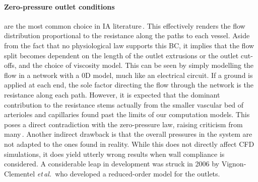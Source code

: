 \paragraph{Zero-pressure outlet conditions} are the most common choice in IA literature\,\cite{Berg2019_challenge, Valen-Sendstad2018}. This effectively renders the flow distribution proportional to the resistance along the paths to each vessel. Aside from the fact that no physiological law supports this BC, it implies that the flow split becomes dependent on the length of the outlet extrusions or the outlet cut-offs, and the choice of viscosity model. This can be seen by simply modelling the flow in a network with a 0D model, much like an electrical circuit. If a ground is applied at each end, the sole factor directing the flow through the network is the resistance along each path. However, it is expected that the dominant contribution to the resistance stems actually from the smaller vascular bed of arterioles and capillaries found past the limits of our computation models. This poses a direct contradiction with the zero-pressure law, raising criticism from many\,\cite{Berg2019_challenge, Chnafa2018, Chnafa2017, Vignon-Clementel2006}. Another indirect drawback is that the overall pressures in the system are not adapted to the ones found in reality. While this does not directly affect CFD simulations, it does yield utterly wrong results when wall compliance is considered. A considerable leap in development was struck in 2006 by Vignon-Clementel \textit{et\,al.}\,\cite{Vignon-Clementel2006} who developed a reduced-order model for the outlets.

